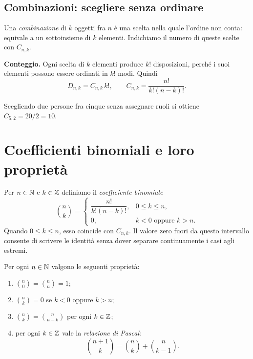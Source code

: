 \subsection{Combinazioni: scegliere senza ordinare}

Una \emph{combinazione} di $k$ oggetti fra $n$ è una scelta nella quale l'ordine non conta: equivale a un sottoinsieme di $k$ elementi. Indichiamo il numero di queste scelte con $C_{n,k}$.

\textbf{Conteggio.} Ogni scelta di $k$ elementi produce $k!$ disposizioni, perché i suoi elementi possono essere ordinati in $k!$ modi. Quindi
\[
  D_{n,k}=C_{n,k}\,k!,\qquad
  C_{n,k}=\frac{n!}{k!(n-k)!}.
\]
\begin{esempio}
Scegliendo due persone fra cinque senza assegnare ruoli si ottiene $C_{5,2}=20/2=10$.
\end{esempio}

\section{Coefficienti binomiali e loro proprietà}

Per $n\in\mathbb{N}$ e $k\in\mathbb{Z}$ definiamo il \emph{coefficiente binomiale}
\[
  \binom nk=
  \begin{cases}
    \dfrac{n!}{k!(n-k)!},&0\le k\le n,\\[.8em]
    0,&k<0\text{ oppure }k>n.
  \end{cases}
\]
Quando $0\le k\le n$, esso coincide con $C_{n,k}$. Il valore zero fuori da questo intervallo consente di scrivere le identità senza dover separare continuamente i casi agli estremi.

\begin{proposizione}
Per ogni $n\in\mathbb{N}$ valgono le seguenti proprietà:
\begin{enumerate}
  \item $\displaystyle\binom n0=\binom nn=1$;
  \item $\displaystyle\binom nk=0$ se $k<0$ oppure $k>n$;
  \item $\displaystyle\binom nk=\binom n{n-k}$ per ogni $k\in\mathbb{Z}$;
  \item per ogni $k\in\mathbb{Z}$ vale la \emph{relazione di Pascal}:
    \[
      \binom{n+1}k=\binom nk+\binom n{k-1}.
    \]
\end{enumerate}
\end{proposizione}

